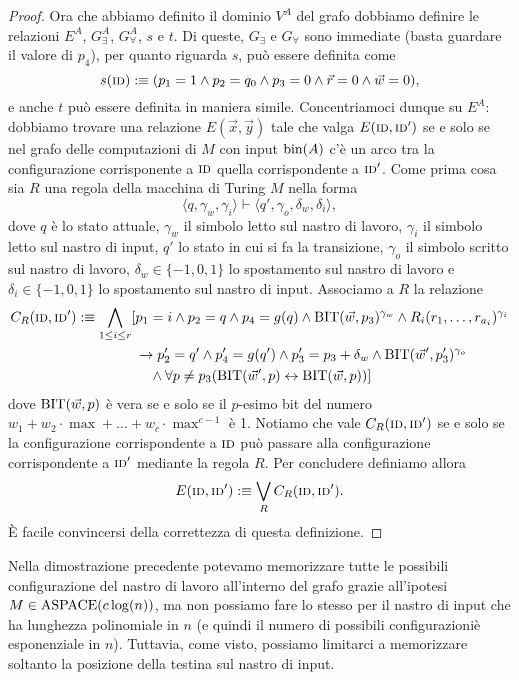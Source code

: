 \begin{proof}
  Ora che abbiamo definito il dominio $V^A$ del grafo dobbiamo definire le
  relazioni $E^A$, $G_\exists^A$, $G_\forall^A$, $s$ e $t$. Di queste, $G_\exists$
  e $G_\forall$ sono immediate
  (basta guardare il valore di $p_4$), per quanto riguarda $s$, può essere
  definita come
  \[s(\textsc{id}) :\equiv (p_1=1 \land p_2 = q_0 \land p_3=0 \land \vec{r}=0 \land \vec{w}=0),\]
  e anche $t$ può essere definita in maniera simile.
  Concentriamoci dunque su $E^A$: dobbiamo
  trovare una relazione $E(\vec{x},\vec{y})$ tale che
  valga $E(\textsc{id}, \textsc{id}')$ se e solo se nel grafo delle
  computazioni di $M$ con input $\operatorname{bin}(A)$ c'è un arco tra la configurazione
  corrisponente a $\textsc{id}$ quella corrispondente a $\textsc{id}'$.
  Come prima cosa sia $R$ una regola della macchina di Turing $M$ nella forma
  \[\langle q, \gamma_w, \gamma_i \rangle \vdash
   \langle q', \gamma_o, \delta_w, \delta_i \rangle,
  \] dove $q$ è lo stato attuale, $\gamma_w$ il simbolo letto sul nastro di lavoro,
  $\gamma_i$ il simbolo letto sul nastro di input, $q'$ lo stato in cui si fa la transizione,
  $\gamma_o$ il simbolo scritto sul nastro di lavoro,
  $\delta_w \in \{-1,0,1\}$ lo spostamento sul nastro di lavoro e $\delta_i \in \{-1,0,1\}$
  lo spostamento sul nastro di input.
  Associamo a $R$ la relazione
  \begin{align*}
  C_R(\textsc{id}, \textsc{id}') :\equiv  \bigwedge_{1 \leq i \leq r} [ & p_1=i \land p_2=q \land p_4=g(q)
    \land \operatorname{BIT}(\vec{w},p_3)^{\gamma_w} \land R_i(r_1,\ldots,r_{a_i})^{\gamma_i} \\
    & \rightarrow p_2'=q' \land p_4'=g(q') \land p_3'=p_3 + \delta_w \land
    \operatorname{BIT}(\vec{w}', p_3')^{\gamma_o} \\
    & \phantom{\rightarrow} \land \forall p \neq p_3 (\operatorname{BIT}(\vec{w}',p) \leftrightarrow \operatorname{BIT}(\vec{w},p))]
  \end{align*}
  dove $\operatorname{BIT}(\vec{w},p)$ è vera se e solo se il $p$-esimo bit del numero
  $w_1 + w_2 \cdot \max + \ldots + w_c \cdot \max^{c-1}$ è 1.
  Notiamo che vale $C_R(\textsc{id}, \textsc{id}')$ se e solo se la configurazione corrispondente
  a $\textsc{id}$ può passare alla configurazione corrispondente a $\textsc{id}'$ mediante la regola
  $R$. Per concludere definiamo allora
  \[ E(\textsc{id}, \textsc{id}') :\equiv \bigvee_R C_R(\textsc{id}, \textsc{id}'). \]
  \`E facile convincersi della correttezza di questa definizione.
\end{proof}

\begin{osservazione}
  Nella dimostrazione precedente potevamo
  memorizzare tutte le possibili configurazione del nastro di lavoro all'interno
  del grafo grazie all'ipotesi $M \in \operatorname{ASPACE}(c \log(n))$, ma non possiamo
  fare lo stesso per il nastro di input che ha lunghezza
  polinomiale in $n$ (e quindi il numero di possibili configurazioniè esponenziale in $n$).
  Tuttavia, come visto, possiamo limitarci a memorizzare soltanto la posizione
  della testina sul nastro di input.
\end{osservazione}

